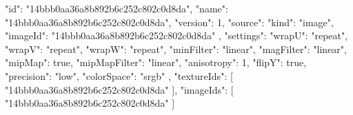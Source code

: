 {
  "id": "14bbb0aa36a8b892b6c252c802c0d8da",
  "name": "14bbb0aa36a8b892b6c252c802c0d8da",
  "version": 1,
  "source": {
    "kind": "image",
    "imageId": "14bbb0aa36a8b892b6c252c802c0d8da"
  },
  "settings": {
    "wrapU": "repeat",
    "wrapV": "repeat",
    "wrapW": "repeat",
    "minFilter": "linear",
    "magFilter": "linear",
    "mipMap": true,
    "mipMapFilter": "linear",
    "anisotropy": 1,
    "flipY": true,
    "precision": "low",
    "colorSpace": "srgb"
  },
  "textureIds": [
    "14bbb0aa36a8b892b6c252c802c0d8da"
  ],
  "imageIds": [
    "14bbb0aa36a8b892b6c252c802c0d8da"
  ]
}

